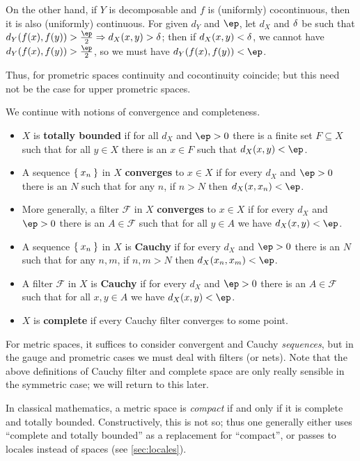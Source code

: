 \documentclass{article}
\def\F{\mathcal{F}}
\begin{document}
On the other hand, if $Y$ is decomposable and $f$ is (uniformly) cocontinuous, then it is also (uniformly) continuous.
For given $d_Y$ and $\ep$, let $d_X$ and $\delta$ be such that $d_Y(f(x),f(y))>\frac{\ep}{2} \Rightarrow d_X(x,y)>\de$; then if $d_X(x,y)<\delta$, we cannot have $d_Y(f(x),f(y))>\frac{\ep}{2}$, so we must have $d_Y(f(x),f(y))<\ep$.

Thus, for prometric spaces continuity and cocontinuity coincide; but this need not be the case for upper prometric spaces.

We continue with notions of convergence and completeness.

\begin{itemize}
\item $X$ is \textbf{totally bounded} if for all $d_X$ and $\ep>0$ there is a finite set $F\subseteq X$ such that for all $y\in X$ there is an $x\in F$ such that $d_X(x,y)<\ep$.
\item A sequence $\Set{x_n}$ in $X$ \textbf{converges} to $x\in X$ if for every $d_X$ and $\ep>0$ there is an $N$ such that for any $n$, if $n>N$ then $d_X(x,x_n)<\ep$.
\item More generally, a filter $\F$ in $X$ \textbf{converges} to $x\in X$ if for every $d_X$ and $\ep>0$ there is an $A\in\F$ such that for all $y\in A$ we have $d_X(x,y)<\ep$.
\item A sequence $\Set{x_n}$ in $X$ is \textbf{Cauchy} if for every $d_X$ and $\ep>0$ there is an $N$ such that for any $n,m$, if $n,m>N$ then $d_X(x_n,x_m)<\ep$.
\item A filter $\F$ in $X$ is \textbf{Cauchy} if for every $d_X$ and $\ep>0$ there is an $A\in\F$ such that for all $x,y\in A$ we have $d_X(x,y)<\ep$.
\item $X$ is \textbf{complete} if every Cauchy filter converges to some point.
\end{itemize}

For metric spaces, it suffices to consider convergent and Cauchy \emph{sequences}, but in the gauge and prometric cases we must deal with filters (or nets).
Note that the above definitions of Cauchy filter and complete space are only really sensible in the symmetric case; we will return to this later.

In classical mathematics, a metric space is \emph{compact} if and only if it is complete and totally bounded.
Constructively, this is not so; thus one generally either uses ``complete and totally bounded'' as a replacement for ``compact'', or passes to locales instead of spaces (see \cref{sec:locales}).
\end{document}
